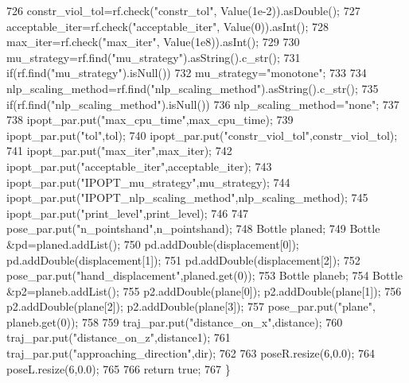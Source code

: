 \begin{DoxyCode}
726     constr\_viol\_tol=rf.check(\textcolor{stringliteral}{"constr\_tol"}, Value(1e-2)).asDouble();
727     acceptable\_iter=rf.check(\textcolor{stringliteral}{"acceptable\_iter"}, Value(0)).asInt();
728     max\_iter=rf.check(\textcolor{stringliteral}{"max\_iter"}, Value(1e8)).asInt();
729 
730     mu\_strategy=rf.find(\textcolor{stringliteral}{"mu\_strategy"}).asString().c\_str();
731     \textcolor{keywordflow}{if}(rf.find(\textcolor{stringliteral}{"mu\_strategy"}).isNull())
732        mu\_strategy=\textcolor{stringliteral}{"monotone"};
733 
734     nlp\_scaling\_method=rf.find(\textcolor{stringliteral}{"nlp\_scaling\_method"}).asString().c\_str();
735     \textcolor{keywordflow}{if}(rf.find(\textcolor{stringliteral}{"nlp\_scaling\_method"}).isNull())
736        nlp\_scaling\_method=\textcolor{stringliteral}{"none"};
737 
738     ipopt\_par.put(\textcolor{stringliteral}{"max\_cpu\_time"},max\_cpu\_time);
739     ipopt\_par.put(\textcolor{stringliteral}{"tol"},tol);
740     ipopt\_par.put(\textcolor{stringliteral}{"constr\_viol\_tol"},constr\_viol\_tol);
741     ipopt\_par.put(\textcolor{stringliteral}{"max\_iter"},max\_iter);
742     ipopt\_par.put(\textcolor{stringliteral}{"acceptable\_iter"},acceptable\_iter);
743     ipopt\_par.put(\textcolor{stringliteral}{"IPOPT\_mu\_strategy"},mu\_strategy);
744     ipopt\_par.put(\textcolor{stringliteral}{"IPOPT\_nlp\_scaling\_method"},nlp\_scaling\_method);
745     ipopt\_par.put(\textcolor{stringliteral}{"print\_level"},print\_level);
746 
747     pose\_par.put(\textcolor{stringliteral}{"n\_pointshand"},n\_pointshand);
748     Bottle planed;
749     Bottle &pd=planed.addList();
750     pd.addDouble(displacement[0]); pd.addDouble(displacement[1]);
751     pd.addDouble(displacement[2]);
752     pose\_par.put(\textcolor{stringliteral}{"hand\_displacement"},planed.get(0));
753     Bottle planeb;
754     Bottle &p2=planeb.addList();
755     p2.addDouble(plane[0]); p2.addDouble(plane[1]);
756     p2.addDouble(plane[2]); p2.addDouble(plane[3]);
757     pose\_par.put(\textcolor{stringliteral}{"plane"}, planeb.get(0));
758 
759     traj\_par.put(\textcolor{stringliteral}{"distance\_on\_x"},distance);
760     traj\_par.put(\textcolor{stringliteral}{"distance\_on\_z"},distance1);
761     traj\_par.put(\textcolor{stringliteral}{"approaching\_direction"},dir);
762 
763     poseR.resize(6,0.0);
764     poseL.resize(6,0.0);
765 
766     \textcolor{keywordflow}{return} \textcolor{keyword}{true};
767 \}
\end{DoxyCode}
